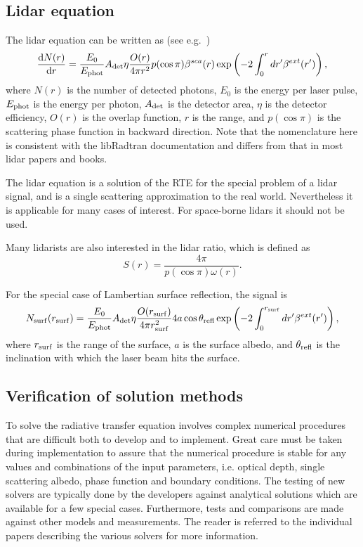 \subsection{Lidar equation}

The lidar equation can be written as (see e.g.~\citet{Weitkamp2005})
%
\begin{equation}
%
\frac{{\rm d}N(r)}{{\rm d}r} =
  \frac{E_0}{E_{\rm phot}} A_{\rm det} \eta \frac{O(r)}{4 \pi r^2}
  p(\cos \pi) \beta^{sca}(r)
  \exp\left(-2\int_0^r dr' \beta^{ext}(r')\right),
%
\label{eq:sslidar}
\end{equation}
%
where $N(r)$ is the number of detected photons, $E_0$ is the energy
per laser pulse, $E_{\rm phot}$ is the energy per photon, $A_{\rm
  det}$ is the detector area, $\eta$ is the detector efficiency,
$O(r)$ is the overlap function, $r$ is the range, and $p(\cos \pi)$ is
the scattering phase function in backward direction. Note that the
nomenclature here is consistent with the libRadtran documentation and
differs from that in most lidar papers and books.

The lidar equation is a solution of the RTE for the special problem of
a lidar signal, and is a single scattering approximation to the real
world. Nevertheless it is applicable for many cases of interest. For
space-borne lidars it should not be used.

Many lidarists are also interested in the lidar ratio, which is
defined as
%
\begin{equation}
%
S(r) = \frac{4 \pi}{p(\cos \pi) \omega(r)}.
%
\label{eq:lidar_ratio}
\end{equation}
%

For the special case of Lambertian surface reflection, the signal is
%
\begin{equation}
%
N_{\rm surf}(r_{\rm surf}) =
  \frac{E_0}{E_{\rm phot}} A_{\rm det} \eta \frac{O(r_{\rm surf})}{4 \pi r_{\rm surf}^2}
  4 a \cos \theta_{\rm refl}
  \exp\left(-2\int_0^{r_{\rm surf}} dr' \beta^{ext}(r')\right),
%
\label{eq:sslidar_surf}
\end{equation}
%
where $r_{\rm surf}$ is the range of the surface, $a$ is the surface
albedo, and $\theta_{\rm refl}$ is the inclination with which the
laser beam hits the surface.

\subsection{Verification of solution methods}
To solve the radiative transfer equation involves complex numerical
procedures that are difficult both to develop and to implement. Great
care must be taken during implementation to assure that the numerical
procedure is stable for any values and combinations of 
the input parameters, i.e. optical depth, single scattering albedo, phase
function and boundary conditions. The testing of new solvers are
typically done by the developers against analytical solutions which
are available for a few special cases. Furthermore, tests and
comparisons are made against other models and measurements. The reader
is referred to the individual papers describing the various solvers
for more information.

